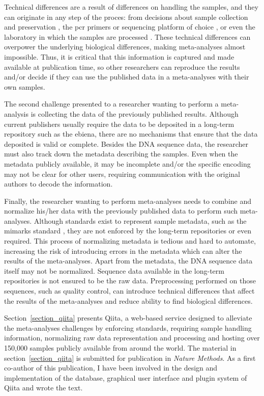 \documentclass[12pt,chapterheads]{ucsd}
\begin{document}
Technical differences are a result of differences on handling the samples, and
they can originate in any step of the proces: from decisions about sample collection and
preservation \cite{Song2016}, the \gls{pcr} primers or sequencing platform of choice
\cite{Kuczynski2011, Tremblay2015}, or even the laboratory in which the samples
are processed \cite{Sinha2017}. These technical differences can overpower
the underlying biological differences, making meta-analyses almost impossible. Thus,
it is critical that this information is captured and made available at publication
time, so other researchers can reproduce the results and/or decide if they can use
the published data in a meta-analyses with their own samples.

The second challenge presented to a researcher wanting to perform a meta-analysis
is collecting the data of the previously published results. Although current publishers
usually require the data to be deposited in a long-term repository such as
the \gls{ebiena}, there are no mechanisms that ensure that the data deposited is valid
or complete. Besides the DNA sequence data, the researcher must also track down
the metadata describing the samples. Even when the metadata publicly available,
it may be incomplete and/or the specific encoding may not
be clear for other users, requiring communication with the original authors to
decode the information.

Finally, the researcher wanting to perform meta-analyses needs to combine and normalize
his/her data with the previously published data to perform such meta-analyses.
Although standards exist to represent sample metadata, such as the \gls{mimarks} standard
\cite{Yilmaz2011}, they are not enforced by the long-term repositories or even required.
This process of normalizing metadata is tedious and hard to automate, increasing
the risk of introducing errors in the metadata which can alter the results
of the meta-analyses. Apart from the metadata, the DNA sequence data itself may
not be normalized. Sequence data available in the long-term repositories is not ensured
to be the raw data. Preprocessing performed on those
sequences, such as quality control, can introduce technical differences that affect
the results of the meta-analyses and reduce ability to find biological differences.

Section~\ref{section_qiita} presents Qiita, a web-based service designed to
alleviate the meta-analyses challenges by enforcing standards, requiring sample
handling information, normalizing raw data representation and processing and hosting
over 150,000 samples publicly available from around the world. The material in section~\ref{section_qiita}
is submitted for publication in \textsl{Nature Methods}. As a first
co-author of this publication, I have been involved in the design and implementation of
the database, graphical user interface and plugin system of Qiita and wrote the text.
\end{document}
